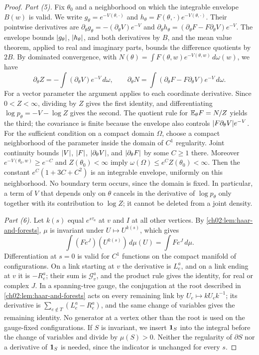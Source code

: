 \begin{proof}
\emph{Part (5).} Fix $\theta_0$ and a neighborhood on which the integrable envelope $B(w)$ is valid. We write $g_\theta=e^{-V(\theta,\cdot)}$ and $h_\theta=F(\theta,\cdot)e^{-V(\theta,\cdot)}$. Their pointwise derivatives are $\partial_\theta g_\theta=-(\partial_\theta V)e^{-V}$ and $\partial_\theta h_\theta=(\partial_\theta F-F\partial_\theta V)e^{-V}$. The envelope bounds $\lvert g_\theta\rvert$, $\lvert h_\theta\rvert$, and both derivatives by $B$, and the mean value theorem, applied to real and imaginary parts, bounds the difference quotients by $2B$. By dominated convergence, with $N(\theta)=\int F(\theta,w)e^{-V(\theta,w)}\,d\omega(w)$, we have
\begin{equation}\label{ch02:eq:score-dominated-derivatives}
 \partial_\theta Z=-\int(\partial_\theta V)e^{-V}\,d\omega,\qquad
 \partial_\theta N=\int(\partial_\theta F-F\partial_\theta V)e^{-V}\,d\omega.
\end{equation}
For a vector parameter the argument applies to each coordinate derivative. Since $0<Z<\infty$, dividing by $Z$ gives the first identity, and differentiating $\log p_\theta=-V-\log Z$ gives the second. The quotient rule for $\mathbb E_\theta F=N/Z$ yields the third; the covariance is finite because the envelope also controls $\lvert F\partial_\theta V\rvert e^{-V}$. For the sufficient condition on a compact domain $\Omega$, choose a compact neighborhood of the parameter inside the domain of $C^1$ regularity. Joint continuity bounds $\lvert V\rvert$, $\lvert F\rvert$, $\lvert \partial_\theta V\rvert$, and $\lvert \partial_\theta F\rvert$ by some $C\ge1$ there. Moreover $e^{-V(\theta_0,w)}\ge e^{-C}$ and $Z(\theta_0)<\infty$ imply $\omega(\Omega)\le e^CZ(\theta_0)<\infty$. Then the constant $e^C(1+3C+C^2)$ is an integrable envelope, uniformly on this neighborhood. No boundary term occurs, since the domain is fixed. In particular, a term of $V$ that depends only on $\theta$ cancels in the derivative of $\log p_\theta$ only together with its contribution to $\log Z$; it cannot be deleted from a joint density.

\emph{Part (6).} Let $k(s)$ equal $e^{s\tau_a}$ at $v$ and $I$ at all other vertices. By \cref{ch02:lem:haar-and-forests}, $\mu$ is invariant under $U\mapsto U^{k(s)}$, which gives
\[
 \int(Fe^J)(U^{k(s)})\,d\mu(U)=\int Fe^J\,d\mu.
\]
Differentiation at $s=0$ is valid for $C^1$ functions on the compact manifold of configurations. On a link starting at $v$ the derivative is $L_e^a$, and on a link ending at $v$ it is $-R_e^a$; their sum is $\mathscr G_v^a$, and the product rule gives the identity, for real or complex $J$. In a spanning-tree gauge, the conjugation at the root described in \cref{ch02:lem:haar-and-forests} acts on every remaining link by $U_e\mapsto kU_ek^{-1}$; its derivative is $\sum_{e\notin T}(L_e^a-R_e^a)$, and the same change of variables gives the remaining identity. No generator at a vertex other than the root is used on the gauge-fixed configurations. If $S$ is invariant, we insert $\mathbf 1_S$ into the integral before the change of variables and divide by $\mu(S)>0$. Neither the regularity of $\partial S$ nor a derivative of $\mathbf 1_S$ is needed, since the indicator is unchanged for every $s$.


\end{proof}
